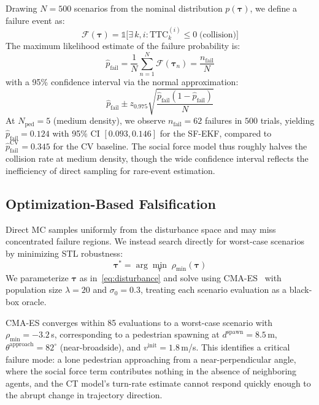 \documentclass[conference]{IEEEtran}
\begin{document}
Drawing $N = 500$ scenarios from the nominal distribution $p(\boldsymbol{\tau})$, we define a failure event as:
\begin{equation}
    \mathcal{F}(\boldsymbol{\tau}) = \mathbb{1}\!\bigl[\exists\, k, i : \mathrm{TTC}_k^{(i)} \leq 0 \;\text{(collision)}\bigr]
    \label{eq:failure_event}
\end{equation}
The maximum likelihood estimate of the failure probability is:
\begin{equation}
    \hat{p}_{\text{fail}} = \frac{1}{N}\sum_{n=1}^{N} \mathcal{F}(\boldsymbol{\tau}_n) = \frac{n_{\text{fail}}}{N}
    \label{eq:mle_pfail}
\end{equation}
with a 95\% confidence interval via the normal approximation:
\begin{equation}
    \hat{p}_{\text{fail}} \pm z_{0.975}\sqrt{\frac{\hat{p}_{\text{fail}}(1-\hat{p}_{\text{fail}})}{N}}
\end{equation}
At $N_{\text{ped}} = 5$ (medium density), we observe $n_{\text{fail}} = 62$ failures in $500$ trials, yielding $\hat{p}_{\text{fail}} = 0.124$ with 95\% CI $[0.093, 0.146]$ for the SF-EKF, compared to $\hat{p}_{\text{fail}}^{\text{CV}} = 0.345$ for the CV baseline. The social force model thus roughly halves the collision rate at medium density, though the wide confidence interval reflects the inefficiency of direct sampling for rare-event estimation.

\subsection{Optimization-Based Falsification}
\label{sec:falsification_opt}

Direct MC samples uniformly from the disturbance space and may miss concentrated failure regions. We instead search directly for worst-case scenarios by minimizing STL robustness:
\begin{equation}
    \boldsymbol{\tau}^* = \arg\min_{\boldsymbol{\tau}} \;\rho_{\min}(\boldsymbol{\tau})
    \label{eq:falsification_opt}
\end{equation}
We parameterize $\boldsymbol{\tau}$ as in~\eqref{eq:disturbance} and solve using CMA-ES~\cite{hansen2003cmaes} with population size $\lambda = 20$ and $\sigma_0 = 0.3$, treating each scenario evaluation as a black-box oracle.

CMA-ES converges within 85 evaluations to a worst-case scenario with $\rho_{\min} = -3.2$\,s, corresponding to a pedestrian spawning at $d^{\text{spawn}} = 8.5$\,m, $\theta^{\text{approach}} = 82^\circ$ (near-broadside), and $v^{\text{init}} = 1.8$\,m/s. This identifies a critical failure mode: a lone pedestrian approaching from a near-perpendicular angle, where the social force term contributes nothing in the absence of neighboring agents, and the CT model's turn-rate estimate cannot respond quickly enough to the abrupt change in trajectory direction.
\end{document}
